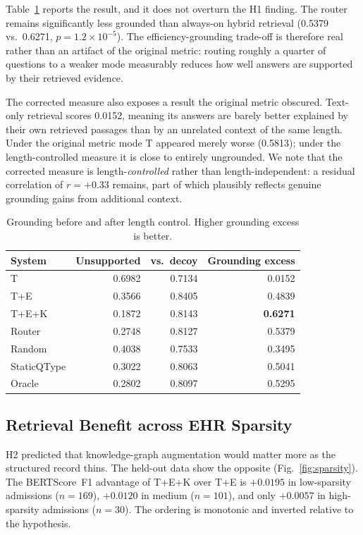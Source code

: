 \documentclass[preprint,12pt]{elsarticle}
\begin{document}
Table~\ref{tab:grounding} reports the result, and it does not overturn
the H1 finding. The router remains significantly less grounded than
always-on hybrid retrieval (0.5379 vs.\ 0.6271,
$p = 1.2\times10^{-5}$). The efficiency-grounding trade-off is
therefore real rather than an artifact of the original metric: routing
roughly a quarter of questions to a weaker mode measurably reduces how
well answers are supported by their retrieved evidence.

The corrected measure also exposes a result the original metric
obscured. Text-only retrieval scores 0.0152, meaning its answers are
barely better explained by their own retrieved passages than by an
unrelated context of the same length. Under the original metric mode T
appeared merely worse (0.5813); under the length-controlled measure it
is close to entirely ungrounded. We note that the corrected measure is
length-\textit{controlled} rather than length-independent: a residual
correlation of $r = +0.33$ remains, part of which plausibly reflects
genuine grounding gains from additional context.

\begin{table}[t]
\centering
\footnotesize
\setlength{\tabcolsep}{4pt}
\caption{Grounding before and after length control. Higher grounding excess is better.}
\label{tab:grounding}
\begin{tabular}{lrrr}
\toprule
System & Unsupported & vs.\ decoy & Grounding excess \\
\midrule
T           & 0.6982 & 0.7134 & 0.0152 \\
T+E         & 0.3566 & 0.8405 & 0.4839 \\
T+E+K       & 0.1872 & 0.8143 & \textbf{0.6271} \\
Router      & 0.2748 & 0.8127 & 0.5379 \\
Random      & 0.4038 & 0.7533 & 0.3495 \\
StaticQType & 0.3022 & 0.8063 & 0.5041 \\
Oracle      & 0.2802 & 0.8097 & 0.5295 \\
\bottomrule
\end{tabular}
\end{table}

\subsection{Retrieval Benefit across EHR Sparsity}
\label{sec:sparsity}

H2 predicted that knowledge-graph augmentation would matter more as
the structured record thins. The held-out data show the opposite
(Fig.~\ref{fig:sparsity}). The BERTScore~F1 advantage of T+E+K over
T+E is $+0.0195$ in low-sparsity admissions ($n = 169$), $+0.0120$ in
medium ($n = 101$), and only $+0.0057$ in high-sparsity admissions
($n = 30$). The ordering is monotonic and inverted relative to the
hypothesis.
\end{document}
